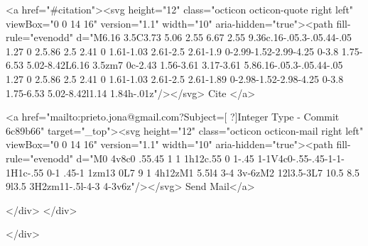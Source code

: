       <a  href="#citation"><svg height="12" class="octicon octicon-quote right left" viewBox="0 0 14 16" version="1.1" width="10" aria-hidden="true"><path fill-rule="evenodd" d="M6.16 3.5C3.73 5.06 2.55 6.67 2.55 9.36c.16-.05.3-.05.44-.05 1.27 0 2.5.86 2.5 2.41 0 1.61-1.03 2.61-2.5 2.61-1.9 0-2.99-1.52-2.99-4.25 0-3.8 1.75-6.53 5.02-8.42L6.16 3.5zm7 0c-2.43 1.56-3.61 3.17-3.61 5.86.16-.05.3-.05.44-.05 1.27 0 2.5.86 2.5 2.41 0 1.61-1.03 2.61-2.5 2.61-1.89 0-2.98-1.52-2.98-4.25 0-3.8 1.75-6.53 5.02-8.42l1.14 1.84h-.01z"/></svg> Cite
      </a>

      <a href="mailto:prieto.jona@gmail.com?Subject=[ ?]Integer Type - Commit 6c89b66" target="_top"><svg height="12" class="octicon octicon-mail right left" viewBox="0 0 14 16" version="1.1" width="10" aria-hidden="true"><path fill-rule="evenodd" d="M0 4v8c0 .55.45 1 1 1h12c.55 0 1-.45 1-1V4c0-.55-.45-1-1-1H1c-.55 0-1 .45-1 1zm13 0L7 9 1 4h12zM1 5.5l4 3-4 3v-6zM2 12l3.5-3L7 10.5 8.5 9l3.5 3H2zm11-.5l-4-3 4-3v6z"/></svg> Send Mail</a>

    </div>
  </div>

</div>





